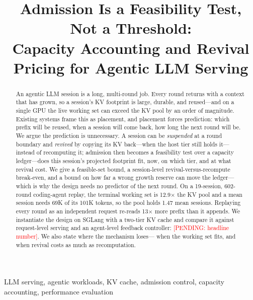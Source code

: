 \documentclass[10pt,conference]{IEEEtran}
\newcommand{\pend}[1]{\textcolor{red}{[PENDING: #1]}}
\begin{document}
\title{Admission Is a Feasibility Test, Not a Threshold:\\
Capacity Accounting and Revival Pricing for Agentic LLM Serving}

\author{}

\maketitle

\begin{abstract}
An agentic LLM session is a long, multi-round job. Every round returns with a context
that has grown, so a session's KV footprint is large, durable, and reused---and on a
single GPU the live working set can exceed the KV pool by an order of magnitude.
Existing systems frame this as placement, and placement forces prediction: which prefix
will be reused, when a session will come back, how long the next round will be. We argue
the prediction is unnecessary. A session can be \emph{suspended} at a round boundary and
\emph{revived} by copying its KV back---when the host tier still holds it---instead of
recomputing it; admission then becomes a
feasibility test over a capacity ledger---does this session's projected footprint fit,
now, on which tier, and at what revival cost. We give a feasible-set bound, a
session-level revival-versus-recompute break-even, and a bound on how far a wrong growth
reserve can move the ledger---which is why the design needs no predictor of the next round. On a
19-session, 602-round coding-agent replay, the terminal working set is 12.9$\times$ the
KV pool and a mean session needs 69K of its 101K tokens, so the pool holds
1.47 mean sessions. Replaying every round as an independent request re-reads
13$\times$ more prefix than it appends. We instantiate the design on SGLang with a
two-tier KV cache and compare it against request-level serving and an agent-level
feedback controller: \pend{headline number}. We also state where the mechanism loses---
when the working set fits, and when revival costs as much as recomputation.
\end{abstract}

\begin{IEEEkeywords}
LLM serving, agentic workloads, KV cache, admission control, capacity accounting,
performance evaluation
\end{IEEEkeywords}














\end{document}
